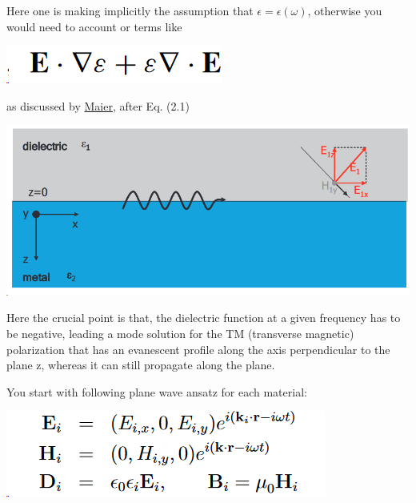\documentclass[11pt]{article}
\begin{document}
Here one is making implicitly the assumption that \(\epsilon = \epsilon ( \omega)\), otherwise
you would need to account or terms like


\begin{center}
\includegraphics[width=.9\linewidth]{./Surface_plasmon_polaritons_(SPP)/2023-08-22_15-20-39_screenshot.png}
\end{center}

as discussed by \href{./Maier\_PLASMONICS.pdf}{Maier}, after Eq. (2.1)


\begin{center}
\includegraphics[width=.9\linewidth]{./Surface_plasmon_polaritons_(SPP)/2023-08-21_19-49-35_screenshot.png}
\end{center}


Here the crucial point is that, the dielectric function at a given
frequency has to be negative, leading a mode solution for the TM
(transverse magnetic) polarization that has an evanescent profile
along the axis perpendicular to the plane z, whereas it can still
propagate along the plane.

You start with following plane wave ansatz for each material:


\begin{center}
\includegraphics[width=.9\linewidth]{./Surface_plasmon_polaritons_(SPP)/2023-08-22_15-33-50_screenshot.png}
\end{center}
\end{document}

